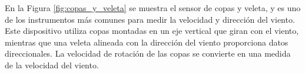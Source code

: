 En la Figura \ref{fig:copas_y_veleta} se muestra el sensor de copas y veleta, y es uno de los instrumentos más comunes para medir la velocidad y dirección del viento. Este dispositivo utiliza copas montadas en un eje vertical que giran con el viento, mientras que una veleta alineada con la dirección del viento proporciona datos direccionales. La velocidad de rotación de las copas se convierte en una medida de la velocidad del viento.
\begin{figure}[H]
    \centering
    \begin{minipage}[b]{0.4\textwidth}
        \centering
    \end{minipage}%
    \hspace{1em} %
    \begin{minipage}[b]{0.4\textwidth}
        \centering

\end{minipage}
\end{figure}

